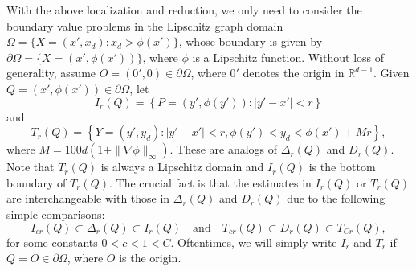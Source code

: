 \documentclass[reqno,12pt]{amsart} %
\theoremstyle{definition}
\theoremstyle{remark}
\numberwithin{equation}{section}
\newcommand{\cL}{\mathcal{L}}
\newcommand{\R}{\mathbb{R}}
\newcommand{\e}{\varepsilon}
\begin{document}
With the above localization and reduction, we only need to consider the boundary value problems in the Lipschitz  graph domain $\Omega = \{ X = (x', x_d): x_d > \phi(x') \}$, whose boundary is given by $\partial \Omega = \{ X = (x',\phi(x')) \}$, where $\phi$ is a Lipschitz function. 
Without loss of generality, assume $O = (0',0) \in \partial \Omega$, where $0'$ denotes the origin in $\R^{d-1}$.
Given $Q = (x',\phi(x')) \in \partial \Omega$, let 
\begin{equation}\label{I-r}
I_r(Q) = \left\{ P = (y',\phi(y')): |y'-x'|<r \right\}
\end{equation}
and 
\begin{equation}\label{T-r}
T_r(Q) = \left\{ Y = (y',y_d): |y'-x'|<r, \phi(y') < y_d < \phi(x') + M r \right\},
\end{equation}
where $M=100d(1+ \| \nabla \phi \|_\infty).$
These are analogs of $\Delta_r(Q)$ and $D_r(Q)$. Note that $T_r(Q)$ is always a Lipschitz domain and $I_r(Q)$ is the bottom boundary of $T_r(Q)$. The crucial fact is that the estimates in $I_r(Q)$ or $T_r(Q)$ are interchangeable with those in $\Delta_r(Q)$ and $D_r(Q)$ due to the following simple comparisons: 
\begin{equation}\label{eq.Tr=Dr}
    I_{cr}(Q) \subset \Delta_r(Q) \subset I_r(Q) \quad \text{and} \quad T_{cr}(Q) \subset D_r(Q) \subset T_{Cr}(Q),
\end{equation}
for some constants $0<c<1<C$. Oftentimes, we will simply write $I_r$ and $T_r$ if $Q = O \in \partial \Omega$, where $O$ is the origin.
\end{document}
